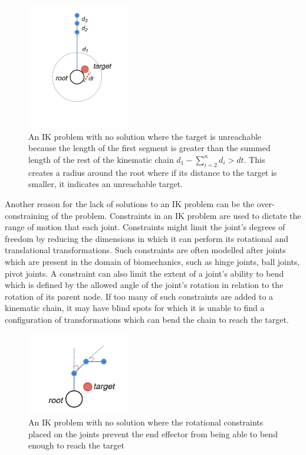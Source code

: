 \begin{figure}
    \centering
    \captionsetup{justification=centering}
    \includegraphics[width=0.4\textwidth]{grafika/unreachable_dist_2.png}
    \caption{An IK problem with no solution where the target is unreachable
    because the length of the first segment is greater than the summed length of
    the rest of the kinematic chain \(d_1 - \sum_{i=2}^{n}d_i > dt\). This creates
    a radius around the root where if its distance to the target is smaller, it
    indicates an unreachable target.  } \label{fig:unreachable_dist2}
\end{figure}

Another reason for the lack of solutions to an IK problem can be the
over-constraining of the problem. Constraints in an IK problem are used to
dictate the range of motion that each joint. Constraints might limit the joint's degrees of
freedom by reducing the dimensions in which it can perform its rotational and
translational transformations. Such constraints are often modelled after joints
which are present in the domain of biomechanics, such as hinge joints, ball
joints, pivot joints. A constraint can also limit the extent of a joint's
ability to bend which is defined by the allowed angle of the joint's rotation in
relation to the rotation of its parent node. If too many of such constraints are
added to a kinematic chain, it may have blind spots for which it is unable to
find a configuration of transformations which can bend the chain to reach the
target.

\begin{figure}
    \centering
    \captionsetup{justification=centering}
    \includegraphics[width=0.4\textwidth]{grafika/unreachable_angles.png}
    \caption{An IK problem with no solution where the rotational constraints
    placed on the joints prevent the end effector from being able to bend enough
    to reach the target}
    \label{fig:params}
\end{figure}


